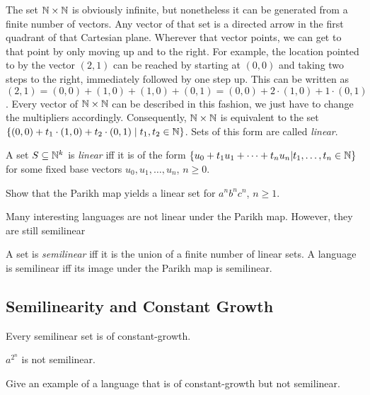The set $\mathbb{N} \times \mathbb{N}$ is obviously infinite, but nonetheless it can be generated from a finite number of vectors.
Any vector of that set is a directed arrow in the first quadrant of that Cartesian plane.
Wherever that vector points, we can get to that point by only moving up and to the right.
For example, the location pointed to by the vector $(2,1)$ can be reached by starting at $(0,0)$ and taking two steps to the right, immediately followed by one step up.
This can be written as $(2,1) = (0,0) + (1,0) + (1,0) + (0,1) = (0,0) + 2 \cdot (1,0) + 1 \cdot (0,1)$.
Every vector of $\mathbb{N} \times \mathbb{N}$ can be described in this fashion, we just have to change the multipliers accordingly.
Consequently, $\mathbb{N} \times \mathbb{N}$ is equivalent to the set $\left \{ (0,0) + t_1 \cdot (1,0) + t_2 \cdot (0,1) \mid t_1, t_2 \in \mathbb{N} \right \}$.
Sets of this form are called \emph{linear}.
%
\begin{definition}
    A set $S \subseteq \mathbb{N}^k$ is \emph{linear} iff it is of the form $\{u_0 + t_1 u_1 + \cdots + t_n u_n | t_1, \ldots, t_n \in \mathbb{N}\}$ for some fixed base vectors $u_0, u_1, \ldots, u_n$, $n \geq 0$.
\end{definition}
%
\begin{exercise}
    Show that the Parikh map yields a linear set for $a^n b^n c^n$, $n \geq 1$.
\end{exercise}

Many interesting languages are not linear under the Parikh map.
However, they are still semilinear

\begin{definition}[Semilinearity]
    A set is \emph{semilinear} iff it is the union of a finite number of linear sets.
    A language is semilinear iff its image under the Parikh map is semilinear.
\end{definition}

\subsection{Semilinearity and Constant Growth}

\begin{theorem}
    Every semilinear set is of constant-growth.
\end{theorem}

\begin{corollary}
    $a^{2^n}$ is not semilinear.
\end{corollary}
%
\begin{exercise}
    Give an example of a language that is of constant-growth but not semilinear.
\end{exercise}

